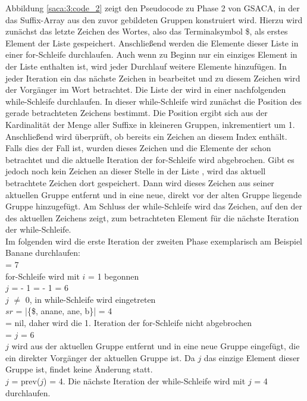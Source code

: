 Abbildung \ref{saca:3:code_2} zeigt den Pseudocode zu Phase 2 von GSACA, in der das Suffix-Array aus den zuvor gebildeten Gruppen konstruiert wird.
Hierzu wird zunächst das letzte Zeichen des Wortes, also das Terminalsymbol \$, als erstes Element der Liste \sa gespeichert. 
Anschließend werden die Elemente dieser Liste in einer for-Schleife durchlaufen.
Auch wenn zu Beginn nur ein einziges Element in der Liste enthalten ist, wird jeder Durchlauf weitere Elemente hinzufügen.
In jeder Iteration ein das nächste Zeichen in \sa bearbeitet und zu diesem Zeichen wird der Vorgänger im Wort betrachtet. 
Die Liste der \prevpointer wird in einer nachfolgenden while-Schleife durchlaufen.
In dieser while-Schleife wird zunächst die Position des gerade betrachteten Zeichens bestimmt. 
Die Position ergibt sich aus der Kardinalität der Menge aller Suffixe in kleineren Gruppen, inkrementiert um 1. 
Anschließend wird überprüft, ob \sa bereits ein Zeichen an diesem Index enthält. 
Falls dies der Fall ist, wurden dieses Zeichen und die Elemente der \prevpointer schon betrachtet und die aktuelle Iteration der for-Schleife wird abgebrochen. 
Gibt es jedoch noch kein Zeichen an dieser Stelle in der Liste \sa, wird das aktuell betrachtete Zeichen dort gespeichert. 
Dann wird dieses Zeichen aus seiner aktuellen Gruppe entfernt und in eine neue, direkt vor der alten Gruppe liegende Gruppe hinzugefügt.
Am Schluss der while-Schleife wird das Zeichen, auf den der \prevpointer des aktuellen Zeichens zeigt, zum betrachteten Element für die nächste Iteration der while-Schleife.\\

\newpage
Im folgenden wird die erste Iteration der zweiten Phase exemplarisch am Beispiel Banane durchlaufen:\\
\sa[1] = 7\\
for-Schleife wird mit $i$ = 1 begonnen\\
$j$ = \sa[$i$] - 1 = \sa[1] - 1 = 6\\
$j$ $\neq$ 0, in while-Schleife wird eingetreten\\
$sr$ = |\{\$, anane, ane, b\}| = 4\\
\sa[$sr$ + 1] = nil, daher wird die 1. Iteration der for-Schleife nicht abgebrochen\\
\sa[$sr$ + 1] = $j$ = 6\\
$j$ wird aus der aktuellen Gruppe entfernt und in eine neue Gruppe eingefügt, die ein direkter Vorgänger der aktuellen Gruppe ist. Da $j$ das einzige Element dieser Gruppe ist, findet keine Änderung statt.\\
$j$ = prev($j$) = 4. Die nächste Iteration der while-Schleife wird mit $j$ = 4 durchlaufen.


\clearpage %
